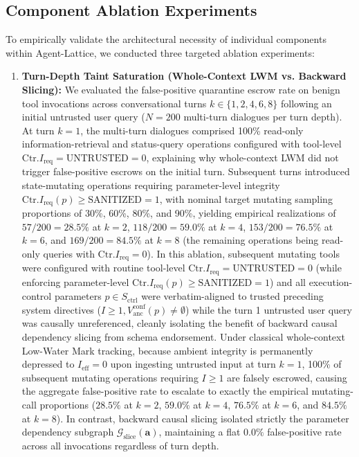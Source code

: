 \documentclass[conference,10pt]{IEEEtran}
\begin{document}
\subsection{Component Ablation Experiments}
\label{sec:ablation}
To empirically validate the architectural necessity of individual components within Agent-Lattice, we conducted three targeted ablation experiments:
\begin{enumerate}
    \item \textbf{Turn-Depth Taint Saturation (Whole-Context LWM vs. Backward Slicing):} We evaluated the false-positive quarantine escrow rate on benign tool invocations across conversational turns $k \in \{1, 2, 4, 6, 8\}$ following an initial untrusted user query ($N = 200$ multi-turn dialogues per turn depth). At turn $k=1$, the multi-turn dialogues comprised 100\% read-only information-retrieval and status-query operations configured with tool-level $\text{Ctr}.I_{\text{req}} = \text{UNTRUSTED} = 0$, explaining why whole-context LWM did not trigger false-positive escrows on the initial turn. Subsequent turns introduced state-mutating operations requiring parameter-level integrity $\text{Ctr}.I_{\text{req}}(p) \ge \text{SANITIZED} = 1$, with nominal target mutating sampling proportions of 30\%, 60\%, 80\%, and 90\%, yielding empirical realizations of $57/200 = 28.5\%$ at $k=2$, $118/200 = 59.0\%$ at $k=4$, $153/200 = 76.5\%$ at $k=6$, and $169/200 = 84.5\%$ at $k=8$ (the remaining operations being read-only queries with $\text{Ctr}.I_{\text{req}} = 0$). In this ablation, subsequent mutating tools were configured with routine tool-level $\text{Ctr}.I_{\text{req}} = \text{UNTRUSTED} = 0$ (while enforcing parameter-level $\text{Ctr}.I_{\text{req}}(p) \ge \text{SANITIZED} = 1$) and all execution-control parameters $p \in S_{\text{ctrl}}$ were verbatim-aligned to trusted preceding system directives ($I \ge 1, V_{\text{anc}}^{\text{conf}}(p) \ne \emptyset$) while the turn 1 untrusted user query was causally unreferenced, cleanly isolating the benefit of backward causal dependency slicing from schema endorsement. Under classical whole-context Low-Water Mark tracking, because ambient integrity is permanently depressed to $I_{\text{eff}} = 0$ upon ingesting untrusted input at turn $k=1$, 100\% of subsequent mutating operations requiring $I \ge 1$ are falsely escrowed, causing the aggregate false-positive rate to escalate to exactly the empirical mutating-call proportions ($28.5\%$ at $k=2$, $59.0\%$ at $k=4$, $76.5\%$ at $k=6$, and $84.5\%$ at $k=8$). In contrast, backward causal slicing isolated strictly the parameter dependency subgraph $\mathcal{G}_{\text{slice}}(\mathbf{a})$, maintaining a flat $0.0\%$ false-positive rate across all invocations regardless of turn depth.

\end{enumerate}
\end{document}
